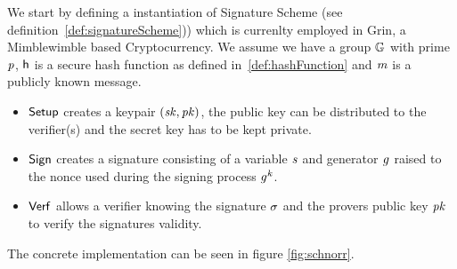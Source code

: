 We start by defining a instantiation of Signature Scheme (see definition~\ref{def:signatureScheme})) which is currenlty employed in Grin, a Mimblewimble based Cryptocurrency.
We assume we have a group $\mathbb{G}$ with prime $\mathit{p}$, $\mathsf{h}$ is a secure hash function as defined in~\ref{def:hashFunction} and $\mathit{m}$ is a publicly known message.\\
\begin{itemize}
    \item $\mathsf{Setup}$ creates a keypair $(\mathit{sk}, \mathit{pk})$, the public key can be distributed to the verifier(s) and the secret key has to be kept private. \\
    \item $\mathsf{Sign}$ creates a signature consisting of a variable $\mathit{s}$ and generator $\mathit{g}$ raised to the nonce used during the signing process $\mathit{g}^{\mathit{k}}$. \\
    \item $\mathsf{Verf}$ allows a verifier knowing the signature $\sigma$ and the provers public key $\mathit{pk}$ to verify the signatures validity. \\
\end{itemize}
The concrete implementation can be seen in figure \ref{fig:schnorr}.
